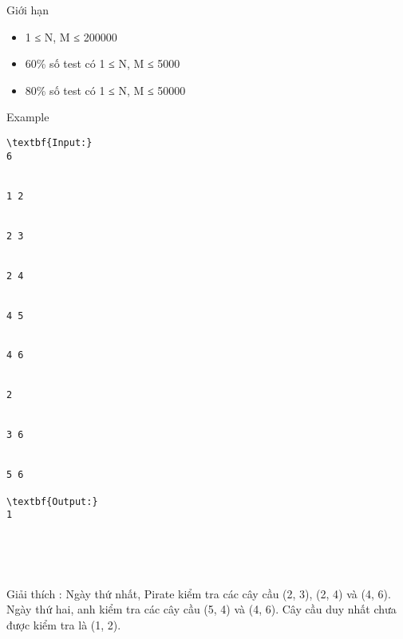 Giới hạn
\begin{itemize}
	\item     1 ≤ N, M ≤ 200000   
	\item     60\% số test có 1 ≤ N, M ≤ 5000   
	\item     80\% số test có 1 ≤ N, M ≤ 50000   
\end{itemize}
Example
\begin{verbatim}
\textbf{Input:}
6


1 2


2 3


2 4


4 5


4 6


2


3 6


5 6

\textbf{Output:}
1





\end{verbatim}

Giải thích        : Ngày thứ nhất, Pirate kiểm tra các cây cầu (2, 3), (2, 4) và (4, 6). Ngày thứ hai, anh kiểm tra các cây cầu (5, 4) và (4, 6). Cây cầu duy nhất chưa được kiểm tra là (1, 2).